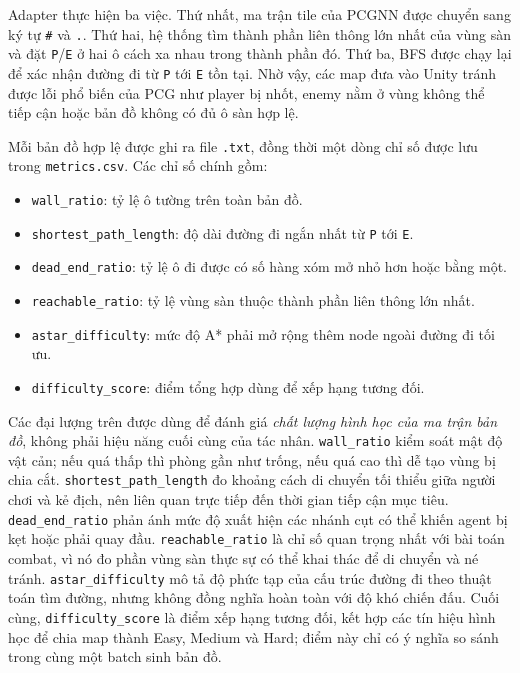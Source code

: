 Adapter thực hiện ba việc. Thứ nhất, ma trận tile của PCGNN được chuyển sang ký tự \texttt{\#} và \texttt{.}. Thứ hai, hệ thống tìm thành phần liên thông lớn nhất của vùng sàn và đặt \texttt{P}/\texttt{E} ở hai ô cách xa nhau trong thành phần đó. Thứ ba, BFS được chạy lại để xác nhận đường đi từ \texttt{P} tới \texttt{E} tồn tại. Nhờ vậy, các map đưa vào Unity tránh được lỗi phổ biến của PCG như player bị nhốt, enemy nằm ở vùng không thể tiếp cận hoặc bản đồ không có đủ ô sàn hợp lệ.

Mỗi bản đồ hợp lệ được ghi ra file \texttt{.txt}, đồng thời một dòng chỉ số được lưu trong \texttt{metrics.csv}. Các chỉ số chính gồm:

\begin{itemize}
    \item \texttt{wall\_ratio}: tỷ lệ ô tường trên toàn bản đồ.
    \item \texttt{shortest\_path\_length}: độ dài đường đi ngắn nhất từ \texttt{P} tới \texttt{E}.
    \item \texttt{dead\_end\_ratio}: tỷ lệ ô đi được có số hàng xóm mở nhỏ hơn hoặc bằng một.
    \item \texttt{reachable\_ratio}: tỷ lệ vùng sàn thuộc thành phần liên thông lớn nhất.
    \item \texttt{astar\_difficulty}: mức độ A* phải mở rộng thêm node ngoài đường đi tối ưu.
    \item \texttt{difficulty\_score}: điểm tổng hợp dùng để xếp hạng tương đối.
\end{itemize}

Các đại lượng trên được dùng để đánh giá \emph{chất lượng hình học của ma trận bản đồ}, không phải hiệu năng cuối cùng của tác nhân. \texttt{wall\_ratio} kiểm soát mật độ vật cản; nếu quá thấp thì phòng gần như trống, nếu quá cao thì dễ tạo vùng bị chia cắt. \texttt{shortest\_path\_length} đo khoảng cách di chuyển tối thiểu giữa người chơi và kẻ địch, nên liên quan trực tiếp đến thời gian tiếp cận mục tiêu. \texttt{dead\_end\_ratio} phản ánh mức độ xuất hiện các nhánh cụt có thể khiến agent bị kẹt hoặc phải quay đầu. \texttt{reachable\_ratio} là chỉ số quan trọng nhất với bài toán combat, vì nó đo phần vùng sàn thực sự có thể khai thác để di chuyển và né tránh. \texttt{astar\_difficulty} mô tả độ phức tạp của cấu trúc đường đi theo thuật toán tìm đường, nhưng không đồng nghĩa hoàn toàn với độ khó chiến đấu. Cuối cùng, \texttt{difficulty\_score} là điểm xếp hạng tương đối, kết hợp các tín hiệu hình học để chia map thành Easy, Medium và Hard; điểm này chỉ có ý nghĩa so sánh trong cùng một batch sinh bản đồ.


